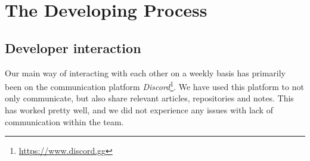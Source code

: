 \section{The Developing Process}
\label{sec:mpt}













\subsection{Developer interaction}
Our main way of interacting with each other on a weekly basis has primarily been on the communication platform \textit{Discord}\footnote{\url{https://www.discord.gg}}. We have used this platform to not only communicate, but also share relevant articles, repositories and notes. This has worked pretty well, and we did not experience any issues with lack of communication within the team.\\


